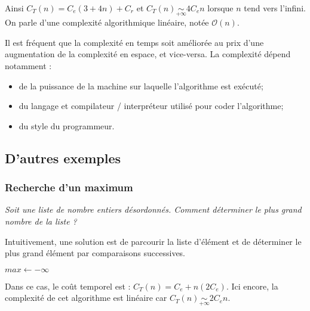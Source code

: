\begin{exemple}
Ainsi $C_T(n) = C_e (3 + 4n)  + C_r$ et $C_T(n)  \underset{+\infty}{\sim} 4C_e n$ lorsque $n$ tend vers l'infini. On parle d'une complexité algorithmique linéaire, notée $\mathcal{O}(n)$.



\end{exemple}



Il est fréquent que la complexité en temps soit améliorée au prix d'une augmentation de la complexité en espace, et vice-versa.
La complexité dépend notamment :
\begin{itemize}
\item de la puissance de la machine sur laquelle l'algorithme est exécuté;
\item du langage et compilateur / interpréteur utilisé pour coder l'algorithme;
\item du style du programmeur.
\end{itemize}



\subsection{D'autres exemples}
\subsubsection{Recherche d'un maximum}
\begin{exemple}
\textit{Soit une liste de nombre entiers désordonnés. Comment déterminer le plus grand nombre de la liste ?}

Intuitivement, une solution est de parcourir la liste d'élément et de déterminer le plus grand élément par comparaisons successives.


\begin{pseudo}
\begin{algorithm}[H]
$max  \leftarrow -\infty$\\
\end{algorithm}
\end{pseudo}

Dans ce cas, le coût temporel est :
$C_T(n) = C_e + n\left(2 C_e \right)$. Ici encore, la complexité de cet algorithme est linéaire car $C_T(n) \underset{+\infty}{\sim} 2 C_e n$.
\end{exemple}

